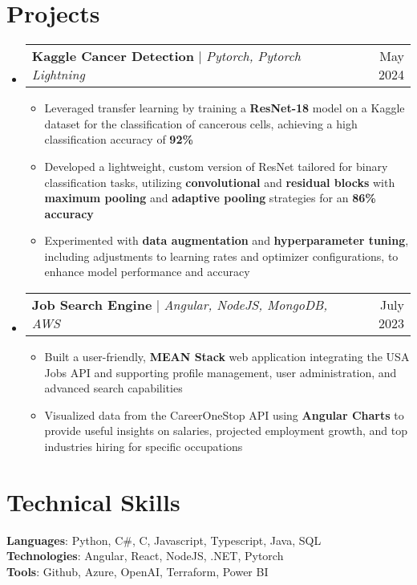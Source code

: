 \documentclass[letterpaper,11pt]{article}
\makeatletter
\newcommand{\resumeItem}[1]{
  \item\small{
    {#1 \vspace{-2pt}}
  }
}
\newcommand{\resumeSubSubheading}[2]{
    \item
    \begin{tabular*}{0.97\textwidth}{l@{\extracolsep{\fill}}r}
      \textit{\small#1} & \textit{\small #2} \\
    \end{tabular*}\vspace{-7pt}
}
\newcommand{\resumeProjectHeading}[2]{
    \item
    \begin{tabular*}{0.97\textwidth}{l@{\extracolsep{\fill}}r}
      \small#1 & #2 \\
    \end{tabular*}\vspace{-7pt}
}
\newcommand{\resumeSubHeadingListStart}{\begin{itemize}[leftmargin=0.15in, label={}]}
\newcommand{\resumeSubHeadingListEnd}{\end{itemize}}
\newcommand{\resumeItemListStart}{\begin{itemize}}
\newcommand{\resumeItemListEnd}{\end{itemize}\vspace{-5pt}}
\makeatother
\begin{document}


\section{Projects}
    \resumeSubHeadingListStart         
    \resumeProjectHeading
    {\textbf{Kaggle Cancer Detection} $|$ \emph{Pytorch, Pytorch Lightning}} {May 2024}
      \resumeItemListStart
        \resumeItem{Leveraged transfer learning by training a \textbf{ResNet-18} model on a Kaggle dataset for the classification of cancerous cells, achieving a high classification accuracy of \textbf{92\%}}
        \resumeItem{Developed a lightweight, custom version of ResNet tailored for binary classification tasks, utilizing \textbf{convolutional} and \textbf{residual blocks} with \textbf{maximum pooling} and \textbf{adaptive pooling} strategies for an \textbf{86\% accuracy}}
        \resumeItem{Experimented with \textbf{data augmentation} and \textbf{hyperparameter tuning}, including adjustments to learning rates and optimizer configurations, to enhance model performance and accuracy}
      \resumeItemListEnd
    
    \resumeProjectHeading
      {\textbf{Job Search Engine} $|$ \emph{Angular, NodeJS, MongoDB, AWS}}{July 2023}
      \resumeItemListStart
        \resumeItem{Built a user-friendly, \textbf{MEAN Stack} web application integrating the USA Jobs API and supporting profile management, user administration, and advanced search capabilities}
        \resumeItem{Visualized data from the CareerOneStop API using \textbf{Angular Charts} to provide useful insights on salaries, projected employment growth, and top industries hiring for specific occupations}
      \resumeItemListEnd
      \resumeSubHeadingListEnd

\section{Technical Skills}
  \begin{itemize}[leftmargin=0.15in, label={}]
    \small{\item{
    {\textbf{Languages}: Python, C\#, C, Javascript, Typescript, Java, SQL}\\
    {\textbf{Technologies}: Angular, React, NodeJS, .NET, Pytorch}\\
    {\textbf{Tools}: Github, Azure, OpenAI, Terraform, Power BI}}}
\end{itemize}
\end{document}
